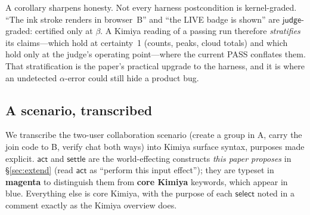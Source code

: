 \documentclass[acmsmall,screen,nonacm]{acmart}
\newcommand{\judge}{\mathsf{judge}}
\newcommand{\select}{\mathsf{select}}
\newcommand{\actc}{\mathsf{act}}
\newcommand{\settle}{\mathsf{settle}}
\theoremstyle{acmdefinition}%
\theoremstyle{acmplain}%
\begin{document}
A corollary sharpens honesty. Not every harness postcondition is
kernel-graded. ``The ink stroke renders in browser~B'' and ``the LIVE
badge is shown'' are $\judge$-graded: certified only at $\beta$. A Kimiya
reading of a passing run therefore \emph{stratifies} its claims---which
hold at certainty~1 (counts, peaks, cloud totals) and which hold only at
the judge's operating point---where the current PASS conflates them. That
stratification is the paper's practical upgrade to the harness, and it is
where an undetected $\alpha$-error could still hide a product bug.

\subsection{A scenario, transcribed}
\label{sec:transcribe}

We transcribe the two-user collaboration scenario (create a group in A,
carry the join code to B, verify chat both ways) into Kimiya surface
syntax, purposes made explicit. $\actc$ and $\settle$
are the world-effecting constructs \emph{this paper proposes} in
\S\ref{sec:extend} (read $\actc$ as ``perform this input effect'');
they are typeset in \textcolor{extcolor}{\bfseries magenta} to
distinguish them from \textcolor{kwcolor}{\bfseries core Kimiya}
keywords, which appear in blue. Everything else is core Kimiya, with the
purpose of each $\select$ noted in a comment exactly as the Kimiya
overview does.
\end{document}
